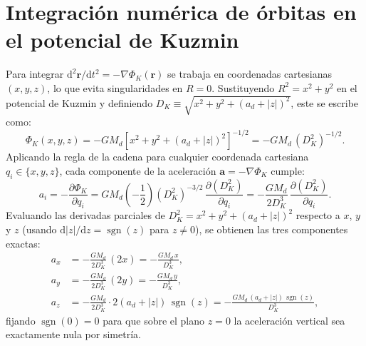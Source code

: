 \documentclass[11pt,letterpaper]{article}
\begin{document}
\section{Integración numérica de órbitas en el potencial de Kuzmin}

Para integrar $\mathrm{d}^2\mathbf{r}/\mathrm{d}t^2 = -\nabla\Phi_K(\mathbf{r})$ se trabaja en coordenadas cartesianas $(x, y, z)$, lo que evita singularidades en $R = 0$. Sustituyendo $R^2 = x^2 + y^2$ en el potencial de Kuzmin y definiendo $D_K \equiv \sqrt{x^2 + y^2 + (a_d + |z|)^2}$, este se escribe como:
\begin{equation}
    \Phi_K(x, y, z) = -G M_d\left[x^2 + y^2 + (a_d + |z|)^2\right]^{-1/2} = -G M_d\,(D_K^2)^{-1/2}.
\end{equation}
Aplicando la regla de la cadena para cualquier coordenada cartesiana $q_i \in \{x, y, z\}$, cada componente de la aceleración $\mathbf{a} = -\nabla\Phi_K$ cumple:
\begin{equation}
    a_i = -\frac{\partial \Phi_K}{\partial q_i}
    = G M_d\left(-\frac{1}{2}\right)(D_K^2)^{-3/2}\,\frac{\partial (D_K^2)}{\partial q_i}
    = -\frac{G M_d}{2 D_K^3}\,\frac{\partial (D_K^2)}{\partial q_i}.
\end{equation}
Evaluando las derivadas parciales de $D_K^2 = x^2 + y^2 + (a_d + |z|)^2$ respecto a $x$, $y$ y $z$ (usando $\mathrm{d}|z|/\mathrm{d}z = \operatorname{sgn}(z)$ para $z \neq 0$), se obtienen las tres componentes exactas:
\begin{align}
    a_x &= -\frac{G M_d}{2 D_K^3}\,(2x) = -\frac{G M_d\,x}{D_K^3}, \nonumber \\
    a_y &= -\frac{G M_d}{2 D_K^3}\,(2y) = -\frac{G M_d\,y}{D_K^3}, \\
    a_z &= -\frac{G M_d}{2 D_K^3}\cdot 2(a_d + |z|)\,\operatorname{sgn}(z) = -\frac{G M_d\,(a_d + |z|)\,\operatorname{sgn}(z)}{D_K^3}, \nonumber
\end{align}
fijando $\operatorname{sgn}(0) = 0$ para que sobre el plano $z = 0$ la aceleración vertical sea exactamente nula por simetría.
\end{document}
